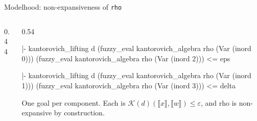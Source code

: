 \documentclass[10pt,aspectratio=169]{beamer}
\newcommand{\den}[1]{\llbracket #1 \rrbracket}
\newcommand{\eps}{\varepsilon}
\newcommand{\Kan}{\mathcal{K}}
\newcommand{\rid}[1]{{\ttfamily\small #1}}
\begin{document}
            \begin{frame}[fragile]{Modelhood: non-expansiveness of
                \texttt{rho}}
                \begin{columns}[T]
                    \begin{column}{0.44\textwidth}
                    \end{column}
                    \begin{column}{0.54\textwidth}
                        \begin{goalbox}[title={after
                                    \texttt{apply: weighted\_sum\_le}
                            --- Goal 1 / 2}]
                            \begin{gconc}
|- kantorovich_lifting d
     (fuzzy_eval kantorovich_algebra rho (Var (inord 0)))
     (fuzzy_eval kantorovich_algebra rho (Var (inord 2)))
   <= eps
                            \end{gconc}
                        \end{goalbox}
                        \begin{goalbox}[title={Goal 2 / 2}]
                            \begin{gconc}
|- kantorovich_lifting d
     (fuzzy_eval kantorovich_algebra rho (Var (inord 1)))
     (fuzzy_eval kantorovich_algebra rho (Var (inord 3)))
   <= delta
                            \end{gconc}
                        \end{goalbox}
                        {\footnotesize One goal per component. Each is
                            $\Kan(d)(\den{x},\den{w}) \leq \eps$, and
                        \rid{rho} is non-expansive by construction.}
                    \end{column}
                \end{columns}
            \end{frame}
\end{document}
